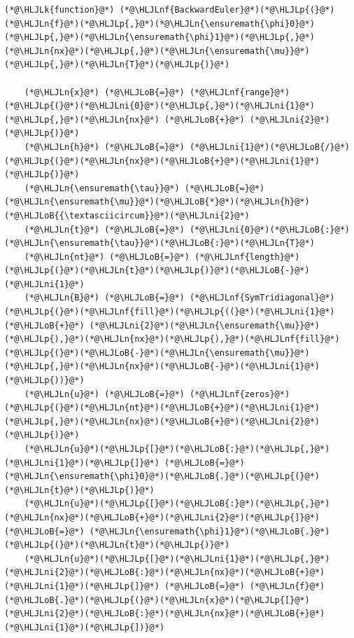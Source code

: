 \documentclass[12pt,a4paper]{article}
\newcommand{\HLJLk}[1]{\textcolor[RGB]{148,91,176}{\textbf{#1}}}
\newcommand{\HLJLn}[1]{#1}
\newcommand{\HLJLnf}[1]{\textcolor[RGB]{66,102,213}{#1}}
\newcommand{\HLJLni}[1]{\textcolor[RGB]{59,151,46}{#1}}
\newcommand{\HLJLoB}[1]{\textcolor[RGB]{102,102,102}{\textbf{#1}}}
\newcommand{\HLJLp}[1]{#1}
\begin{document}
\begin{lstlisting}
(*@\HLJLk{function}@*) (*@\HLJLnf{BackwardEuler}@*)(*@\HLJLp{(}@*)(*@\HLJLn{f}@*)(*@\HLJLp{,}@*)(*@\HLJLn{\ensuremath{\phi}0}@*)(*@\HLJLp{,}@*)(*@\HLJLn{\ensuremath{\phi}1}@*)(*@\HLJLp{,}@*)(*@\HLJLn{nx}@*)(*@\HLJLp{,}@*)(*@\HLJLn{\ensuremath{\mu}}@*)(*@\HLJLp{,}@*)(*@\HLJLn{T}@*)(*@\HLJLp{)}@*)
    
    (*@\HLJLn{x}@*) (*@\HLJLoB{=}@*) (*@\HLJLnf{range}@*)(*@\HLJLp{(}@*)(*@\HLJLni{0}@*)(*@\HLJLp{,}@*)(*@\HLJLni{1}@*)(*@\HLJLp{,}@*)(*@\HLJLn{nx}@*) (*@\HLJLoB{+}@*) (*@\HLJLni{2}@*)(*@\HLJLp{)}@*)
    (*@\HLJLn{h}@*) (*@\HLJLoB{=}@*) (*@\HLJLni{1}@*)(*@\HLJLoB{/}@*)(*@\HLJLp{(}@*)(*@\HLJLn{nx}@*)(*@\HLJLoB{+}@*)(*@\HLJLni{1}@*)(*@\HLJLp{)}@*)
    (*@\HLJLn{\ensuremath{\tau}}@*) (*@\HLJLoB{=}@*) (*@\HLJLn{\ensuremath{\mu}}@*)(*@\HLJLoB{*}@*)(*@\HLJLn{h}@*)(*@\HLJLoB{{\textasciicircum}}@*)(*@\HLJLni{2}@*)
    (*@\HLJLn{t}@*) (*@\HLJLoB{=}@*) (*@\HLJLni{0}@*)(*@\HLJLoB{:}@*)(*@\HLJLn{\ensuremath{\tau}}@*)(*@\HLJLoB{:}@*)(*@\HLJLn{T}@*)
    (*@\HLJLn{nt}@*) (*@\HLJLoB{=}@*) (*@\HLJLnf{length}@*)(*@\HLJLp{(}@*)(*@\HLJLn{t}@*)(*@\HLJLp{)}@*)(*@\HLJLoB{-}@*)(*@\HLJLni{1}@*)
    (*@\HLJLn{B}@*) (*@\HLJLoB{=}@*) (*@\HLJLnf{SymTridiagonal}@*)(*@\HLJLp{(}@*)(*@\HLJLnf{fill}@*)(*@\HLJLp{((}@*)(*@\HLJLni{1}@*) (*@\HLJLoB{+}@*) (*@\HLJLni{2}@*)(*@\HLJLn{\ensuremath{\mu}}@*)(*@\HLJLp{),}@*)(*@\HLJLn{nx}@*)(*@\HLJLp{),}@*)(*@\HLJLnf{fill}@*)(*@\HLJLp{(}@*)(*@\HLJLoB{-}@*)(*@\HLJLn{\ensuremath{\mu}}@*)(*@\HLJLp{,}@*)(*@\HLJLn{nx}@*)(*@\HLJLoB{-}@*)(*@\HLJLni{1}@*)(*@\HLJLp{))}@*)
    (*@\HLJLn{u}@*) (*@\HLJLoB{=}@*) (*@\HLJLnf{zeros}@*)(*@\HLJLp{(}@*)(*@\HLJLn{nt}@*)(*@\HLJLoB{+}@*)(*@\HLJLni{1}@*)(*@\HLJLp{,}@*)(*@\HLJLn{nx}@*)(*@\HLJLoB{+}@*)(*@\HLJLni{2}@*)(*@\HLJLp{)}@*)
    (*@\HLJLn{u}@*)(*@\HLJLp{[}@*)(*@\HLJLoB{:}@*)(*@\HLJLp{,}@*)(*@\HLJLni{1}@*)(*@\HLJLp{]}@*) (*@\HLJLoB{=}@*) (*@\HLJLn{\ensuremath{\phi}0}@*)(*@\HLJLoB{.}@*)(*@\HLJLp{(}@*)(*@\HLJLn{t}@*)(*@\HLJLp{)}@*)
    (*@\HLJLn{u}@*)(*@\HLJLp{[}@*)(*@\HLJLoB{:}@*)(*@\HLJLp{,}@*)(*@\HLJLn{nx}@*)(*@\HLJLoB{+}@*)(*@\HLJLni{2}@*)(*@\HLJLp{]}@*) (*@\HLJLoB{=}@*) (*@\HLJLn{\ensuremath{\phi}1}@*)(*@\HLJLoB{.}@*)(*@\HLJLp{(}@*)(*@\HLJLn{t}@*)(*@\HLJLp{)}@*)
    (*@\HLJLn{u}@*)(*@\HLJLp{[}@*)(*@\HLJLni{1}@*)(*@\HLJLp{,}@*)(*@\HLJLni{2}@*)(*@\HLJLoB{:}@*)(*@\HLJLn{nx}@*)(*@\HLJLoB{+}@*)(*@\HLJLni{1}@*)(*@\HLJLp{]}@*) (*@\HLJLoB{=}@*) (*@\HLJLn{f}@*)(*@\HLJLoB{.}@*)(*@\HLJLp{(}@*)(*@\HLJLn{x}@*)(*@\HLJLp{[}@*)(*@\HLJLni{2}@*)(*@\HLJLoB{:}@*)(*@\HLJLn{nx}@*)(*@\HLJLoB{+}@*)(*@\HLJLni{1}@*)(*@\HLJLp{])}@*)


\end{lstlisting}
\end{document}
